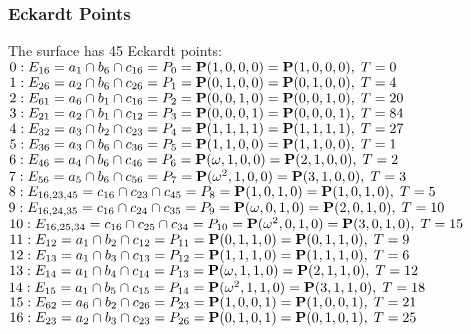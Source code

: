 \documentclass{article}
\newcommand{\bP}{{\bf P}}
\begin{document}
{\subsubsection*{Eckardt Points}
The surface has 45 Eckardt points:\\
$0 : E_{16}=a_{1} \cap b_{6} \cap c_{16} = P_{0}=\bP(1, 0, 0, 0) = \bP(1, 0, 0, 0),\; T= 0$\\
$1 : E_{26}=a_{2} \cap b_{6} \cap c_{26} = P_{1}=\bP(0, 1, 0, 0) = \bP(0, 1, 0, 0),\; T= 4$\\
$2 : E_{61}=a_{6} \cap b_{1} \cap c_{16} = P_{2}=\bP(0, 0, 1, 0) = \bP(0, 0, 1, 0),\; T= 20$\\
$3 : E_{21}=a_{2} \cap b_{1} \cap c_{12} = P_{3}=\bP(0, 0, 0, 1) = \bP(0, 0, 0, 1),\; T= 84$\\
$4 : E_{32}=a_{3} \cap b_{2} \cap c_{23} = P_{4}=\bP(1, 1, 1, 1) = \bP(1, 1, 1, 1),\; T= 27$\\
$5 : E_{36}=a_{3} \cap b_{6} \cap c_{36} = P_{5}=\bP(1, 1, 0, 0) = \bP(1, 1, 0, 0),\; T= 1$\\
$6 : E_{46}=a_{4} \cap b_{6} \cap c_{46} = P_{6}=\bP(\omega , 1, 0, 0) = \bP(2, 1, 0, 0),\; T= 2$\\
$7 : E_{56}=a_{5} \cap b_{6} \cap c_{56} = P_{7}=\bP(\omega^{2}, 1, 0, 0) = \bP(3, 1, 0, 0),\; T= 3$\\
$8 : E_{16,23,45}=c_{16} \cap c_{23} \cap c_{45} = P_{8}=\bP(1, 0, 1, 0) = \bP(1, 0, 1, 0),\; T= 5$\\
$9 : E_{16,24,35}=c_{16} \cap c_{24} \cap c_{35} = P_{9}=\bP(\omega , 0, 1, 0) = \bP(2, 0, 1, 0),\; T= 10$\\
$10 : E_{16,25,34}=c_{16} \cap c_{25} \cap c_{34} = P_{10}=\bP(\omega^{2}, 0, 1, 0) = \bP(3, 0, 1, 0),\; T= 15$\\
$11 : E_{12}=a_{1} \cap b_{2} \cap c_{12} = P_{11}=\bP(0, 1, 1, 0) = \bP(0, 1, 1, 0),\; T= 9$\\
$12 : E_{13}=a_{1} \cap b_{3} \cap c_{13} = P_{12}=\bP(1, 1, 1, 0) = \bP(1, 1, 1, 0),\; T= 6$\\
$13 : E_{14}=a_{1} \cap b_{4} \cap c_{14} = P_{13}=\bP(\omega , 1, 1, 0) = \bP(2, 1, 1, 0),\; T= 12$\\
$14 : E_{15}=a_{1} \cap b_{5} \cap c_{15} = P_{14}=\bP(\omega^{2}, 1, 1, 0) = \bP(3, 1, 1, 0),\; T= 18$\\
$15 : E_{62}=a_{6} \cap b_{2} \cap c_{26} = P_{23}=\bP(1, 0, 0, 1) = \bP(1, 0, 0, 1),\; T= 21$\\
$16 : E_{23}=a_{2} \cap b_{3} \cap c_{23} = P_{26}=\bP(0, 1, 0, 1) = \bP(0, 1, 0, 1),\; T= 25$\\
}
\end{document}

